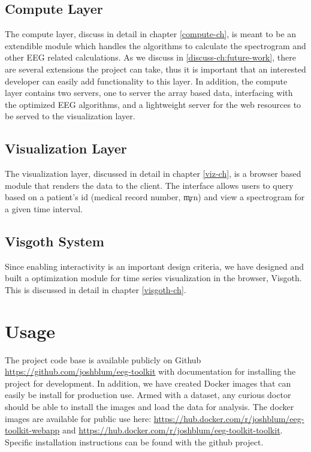 \subsection{Compute Layer}

The compute layer, discuss in detail in chapter \ref{compute-ch}, is meant to be an
extendible module which handles the algorithms to calculate the spectrogram and
other EEG related calculations. As we discuss in \ref{discuss-ch:future-work},
there are several extensions the project can take, thus it is important that an
interested developer can easily add functionality to this layer. In addition,
the compute layer contains two servers, one to server the array based data,
interfacing with the optimized EEG algorithms, and a lightweight server for the
web resources to be served to the visualization layer.

\subsection{Visualization Layer}

The visualization layer, discussed in detail in chapter \ref{viz-ch}, is a browser
based module that renders the data to the client. The interface allows users to
query based on a patient's id (medical record number, \c{mrn}) and view a spectrogram
for a given time interval.

\subsection{Visgoth System}

Since enabling interactivity is an important design criteria, we have designed
and built a optimization module for time series visualization in the browser,
Visgoth. This is discussed in detail in chapter \ref{visgoth-ch}.

\section{Usage}

The project code base is available publicly on Github \cite{github}
\url{https://github.com/joshblum/eeg-toolkit} with documentation for installing
the project for development. In addition, we have created Docker \cite{docker}
images that can easily be install for production use. Armed with a dataset, any
curious doctor should be able to install the images and load the data for
analysis. The docker images are available for public use here:
\url{https://hub.docker.com/r/joshblum/eeg-toolkit-webapp} and
\url{https://hub.docker.com/r/joshblum/eeg-toolkit-toolkit}. Specific
installation instructions can be found with the github project.


